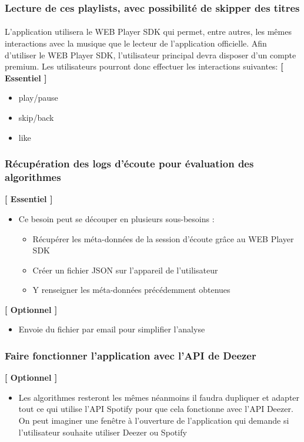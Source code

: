\documentclass{article}
\begin{document}
		\subsubsection{Lecture de ces playlists, avec possibilité de skipper des titres}
		\paragraph{}
		L'application utilisera le WEB Player SDK qui permet, entre autres, les mêmes interactions avec la musique que le lecteur de l'application officielle. Afin d'utiliser le WEB Player SDK, l'utilisateur principal devra disposer d'un compte premium. Les utilisateurs pourront donc effectuer les interactions suivantes: \newline \newline
		\textbf{[ Essentiel ]}
		\begin{itemize}
			\item play/pause
			\item skip/back
			\item like
		\end{itemize}
		\subsubsection{Récupération des logs d'écoute pour évaluation des algorithmes} \label{logs}
		\textbf{[ Essentiel ]}
		\begin{itemize}
	    			\item Ce besoin peut se découper en plusieurs sous-besoins :
			      \begin{itemize}
			      	\item Récupérer les méta-données de la session d'écoute grâce au WEB Player SDK
			      	\item Créer un fichier JSON sur l'appareil de l'utilisateur
			      	\item Y renseigner les méta-données précédemment obtenues
			      \end{itemize}
	    \end{itemize}
	    \textbf{[ Optionnel ]}
		\begin{itemize}
        \item Envoie du fichier par email pour simplifier l'analyse
		\end{itemize}
		\subsubsection{Faire fonctionner l'application avec l'API de Deezer}
	    \textbf{[ Optionnel ]}
		\begin{itemize}
		    \item Les algorithmes resteront les mêmes néanmoins il faudra dupliquer et adapter tout ce qui utilise l'API Spotify pour que cela fonctionne avec l'API Deezer. On peut imaginer une fenêtre à l'ouverture de l'application qui demande si l'utilisateur souhaite utiliser Deezer ou Spotify
		\end{itemize}
\end{document}
